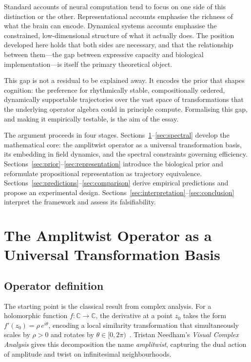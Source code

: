 \documentclass[12pt, a4paper]{article}
\theoremstyle{remark}
\theoremstyle{definition}
\begin{document}
Standard accounts of neural computation tend to focus on one side of this distinction or
the other.  Representational accounts emphasise the richness of what the brain can encode.
Dynamical systems accounts emphasise the constrained, low-dimensional structure of what it
actually does.  The position developed here holds that both sides are necessary, and that
the relationship between them---the gap between expressive capacity and biological
implementation---is itself the primary theoretical object.

This gap is not a residual to be explained away.  It encodes the prior that shapes
cognition: the preference for rhythmically stable, compositionally ordered, dynamically
supportable trajectories over the vast space of transformations that the underlying operator
algebra could in principle compute.  Formalising this gap, and making it empirically
testable, is the aim of the essay.

The argument proceeds in four stages.  Sections~\ref{sec:operator}--\ref{sec:spectral}
develop the mathematical core: the amplitwist operator as a universal transformation basis,
its embedding in field dynamics, and the spectral constraints governing efficiency.
Sections~\ref{sec:prior}--\ref{sec:representation} introduce the biological prior and
reformulate propositional representation as trajectory equivalence.
Sections~\ref{sec:predictions}--\ref{sec:comparison} derive empirical predictions and
propose an experimental design.  Sections~\ref{sec:interpretation}--\ref{sec:conclusion}
interpret the framework and assess its falsifiability.

\section{The Amplitwist Operator as a Universal Transformation Basis}
\label{sec:operator}

\subsection{Operator definition}

The starting point is the classical result from complex analysis.  For a holomorphic
function $f \colon \mathbb{C} \to \mathbb{C}$, the derivative at a point $z_0$ takes the
form $f'(z_0) = \rho\, e^{i\theta}$, encoding a local similarity transformation that
simultaneously scales by $\rho > 0$ and rotates by $\theta \in [0,2\pi)$~\cite{needham1997visual,ahlfors1979complex}.  Tristan
Needham's \emph{Visual Complex Analysis} gives this decomposition the name
\emph{amplitwist}, capturing the dual action of amplitude and twist on infinitesimal
neighbourhoods.
\end{document}
